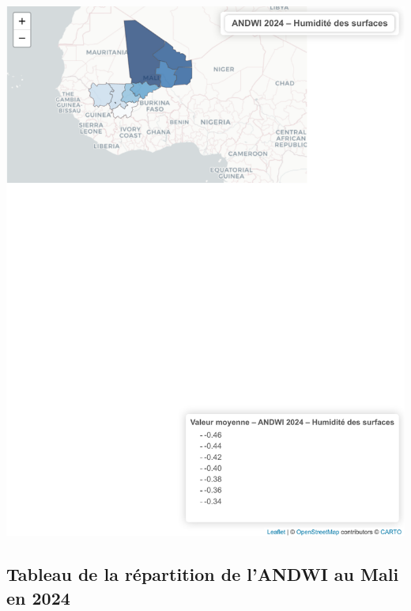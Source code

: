 \documentclass[
]{book}
\begin{document}
\includegraphics{Atlas-Spectral-Sahel_files/figure-latex/eau-andwi-1.pdf}

\subsection{Tableau de la répartition de l'ANDWI au Mali en 2024}\label{tableau-de-la-ruxe9partition-de-landwi-au-mali-en-2024}
\end{document}
